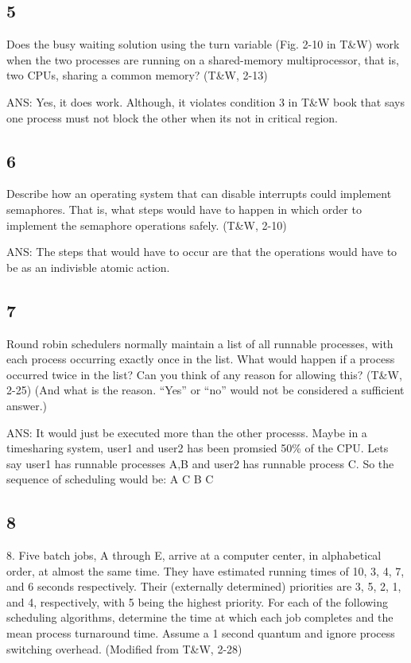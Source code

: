 \documentclass[11pt]{article}
\begin{document}
\subsection{5}
Does the busy waiting solution using the turn variable (Fig. 2-10 in T&W) work when the
 two processes are running on a shared-memory multiprocessor, that is, two CPUs, sharing a
 common memory? (T&W, 2-13)

ANS: 
	Yes, it does work. Although, it violates condition 3 in T&W book that says one process must not block the other when its not in critical region.



\subsection{6}
Describe how an operating system that can disable interrupts could implement semaphores.
	That is, what steps would have to happen in which order to implement the semaphore operations safely. (T&W, 2-10)

ANS:
	The steps that would have to occur are that the operations would have to be as an indivisble atomic action.

\subsection{7}

Round robin schedulers normally maintain a list of all runnable processes, with each process
occurring exactly once in the list. What would happen if a process occurred twice in the list?
Can you think of any reason for allowing this? (T&W, 2-25) (And what is the reason. “Yes”
or “no” would not be considered a sufficient answer.)

ANS:
	It would just be executed more than the other processs. Maybe in a timesharing system, user1 and user2 has been promsied 50\% of the CPU.
	Lets say user1 has runnable processes A,B and user2 has runnable process C. So the sequence of scheduling would be:
		A C B C


\subsection{8}
8. Five batch jobs, A through E, arrive at a computer center, in alphabetical order, at almost
the same time. They have estimated running times of 10, 3, 4, 7, and 6 seconds respectively.
Their (externally determined) priorities are 3, 5, 2, 1, and 4, respectively, with 5 being the
highest priority. For each of the following scheduling algorithms, determine the time at which
each job completes and the mean process turnaround time. Assume a 1 second quantum and
ignore process switching overhead. (Modified from T&W, 2-28)
\end{document}
